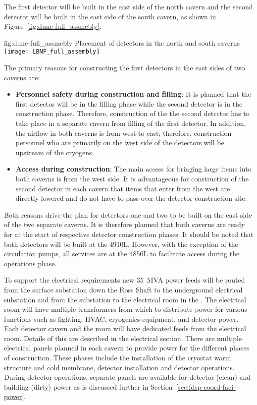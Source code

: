 The first detector will be built in the east side of the north cavern and
the second detector will be built in the east side of the south cavern, as
shown in Figure~\ref{fig:dune-full_assmebly}.
\begin{dunefigure}{fig:dune-full_assmebly}
  {Placement of detectors in the north and south caverns}
  \texttt{[image: LBNF\_full\_assembly]}
\end{dunefigure}
The primary reasons for constructing the first detectors in the east
sides of two caverns are:
\begin{itemize}
\item {\bf Personnel safety during construction and filling}: It is
  planned that the first detector will be in the filling phase while the second detector
  is in the construction phase. Therefore, construction of the the
  second detector has to take place in a separate cavern from
  filling of the first detector. In addition, the airflow in both
  caverns is from west to east; therefore, construction
  personnel who are primarily on the west side of the detectors will
  be upstream of the cryogens.
\item{\bf Access during construction}: The main access for bringing
  large items into both caverns is from the west side. It is
  advantageous for construction of the second detector in each cavern
  that items that enter from the west are directly lowered and do not
  have to pass over the detector construction site.
\end{itemize}
Both reasons drive the plan for detectors one and two to be built on
the east side of the two separate caverns.  It is therefore planned
that both caverns are ready for  at the start of respective
detector construction phases.  It should be noted that both detectors
will be built at the 4910L. However, with the exception of the
 circulation pumps, all services are at the 4850L to
facilitate access during the operations phase.

To support the electrical requirements new 35~MVA power feeds will be
routed from the surface substation down the Ross Shaft to the
underground electrical substation and from the substation to the
electrical room in the .  The electrical room will have
multiple transformers from which to distribute power for various
functions such as lighting, HVAC, cryogenics equipment, and detector  
power.  Each detector cavern and the  room will have
dedicated feeds from the electrical room.  Details of this are
described in the electrical section.  There are multiple electrical
panels planned in each cavern to provide power for the different
phases of construction.  These phases include the installation
of the cryostat warm structure and cold membrane, detector
installation and detector operations. During detector operations, 
separate panels are available for detector (clean) and building
(dirty) power as is discussed further in
Section~\ref{sec:fdsp-coord-faci-power}.

